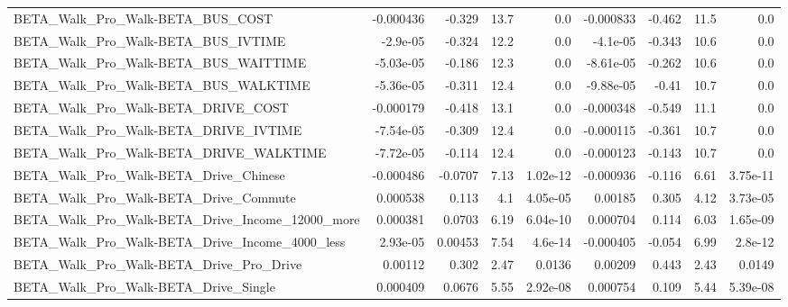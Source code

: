\begin{tabular}{lrrrrrrrr}
BETA\_Walk\_Pro\_Walk-BETA\_BUS\_COST                   &   -0.000436 &       -0.329 &      13.7 &      0.0 &  -0.000833 &      -0.462 &         11.5 &           0.0 \\
BETA\_Walk\_Pro\_Walk-BETA\_BUS\_IVTIME                 &    -2.9e-05 &       -0.324 &      12.2 &      0.0 &   -4.1e-05 &      -0.343 &         10.6 &           0.0 \\
BETA\_Walk\_Pro\_Walk-BETA\_BUS\_WAITTIME               &   -5.03e-05 &       -0.186 &      12.3 &      0.0 &  -8.61e-05 &      -0.262 &         10.6 &           0.0 \\
BETA\_Walk\_Pro\_Walk-BETA\_BUS\_WALKTIME               &   -5.36e-05 &       -0.311 &      12.4 &      0.0 &  -9.88e-05 &       -0.41 &         10.7 &           0.0 \\
BETA\_Walk\_Pro\_Walk-BETA\_DRIVE\_COST                 &   -0.000179 &       -0.418 &      13.1 &      0.0 &  -0.000348 &      -0.549 &         11.1 &           0.0 \\
BETA\_Walk\_Pro\_Walk-BETA\_DRIVE\_IVTIME               &   -7.54e-05 &       -0.309 &      12.4 &      0.0 &  -0.000115 &      -0.361 &         10.7 &           0.0 \\
BETA\_Walk\_Pro\_Walk-BETA\_DRIVE\_WALKTIME             &   -7.72e-05 &       -0.114 &      12.4 &      0.0 &  -0.000123 &      -0.143 &         10.7 &           0.0 \\
BETA\_Walk\_Pro\_Walk-BETA\_Drive\_Chinese              &   -0.000486 &      -0.0707 &      7.13 & 1.02e-12 &  -0.000936 &      -0.116 &         6.61 &      3.75e-11 \\
BETA\_Walk\_Pro\_Walk-BETA\_Drive\_Commute              &    0.000538 &        0.113 &       4.1 & 4.05e-05 &    0.00185 &       0.305 &         4.12 &      3.73e-05 \\
BETA\_Walk\_Pro\_Walk-BETA\_Drive\_Income\_12000\_more    &    0.000381 &       0.0703 &      6.19 & 6.04e-10 &   0.000704 &       0.114 &         6.03 &      1.65e-09 \\
BETA\_Walk\_Pro\_Walk-BETA\_Drive\_Income\_4000\_less     &    2.93e-05 &      0.00453 &      7.54 &  4.6e-14 &  -0.000405 &      -0.054 &         6.99 &       2.8e-12 \\
BETA\_Walk\_Pro\_Walk-BETA\_Drive\_Pro\_Drive            &     0.00112 &        0.302 &      2.47 &   0.0136 &    0.00209 &       0.443 &         2.43 &        0.0149 \\
BETA\_Walk\_Pro\_Walk-BETA\_Drive\_Single               &    0.000409 &       0.0676 &      5.55 & 2.92e-08 &   0.000754 &       0.109 &         5.44 &      5.39e-08 \\

\end{tabular}
